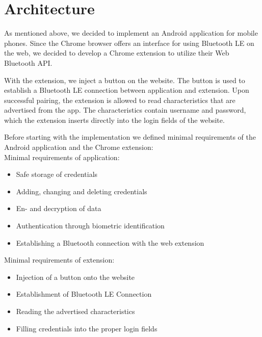 \section{Architecture}
\label{architecture}

As mentioned above, we decided to implement an Android application for mobile phones. Since the Chrome browser offers an interface for using Bluetooth LE on the web, we decided to develop a Chrome extension to utilize their Web Bluetooth API. \cite{WebBTAPI}

With the extension, we inject a button on the website. The button is used to establish a Bluetooth LE connection between application and extension. Upon successful pairing, the extension is allowed to read characteristics that are advertised from the app. The characteristics contain username and password, which the extension inserts directly into the login fields of the website.

\noindent Before starting with the implementation we defined minimal requirements of the Android application and the Chrome extension: \\

\noindent Minimal requirements of application:
\begin{itemize}
\item Safe storage of credentials
\item Adding, changing and deleting credentials
\item En- and decryption of data 
\item Authentication through biometric identification
\item Establishing a Bluetooth connection with the web extension
\end{itemize}
\vspace{0.3cm}
\noindent Minimal requirements of extension:
\begin{itemize}
\item Injection of a button onto the website
\item Establishment of Bluetooth LE Connection
\item Reading the advertised characteristics
\item Filling credentials into the proper login fields
\end{itemize}


